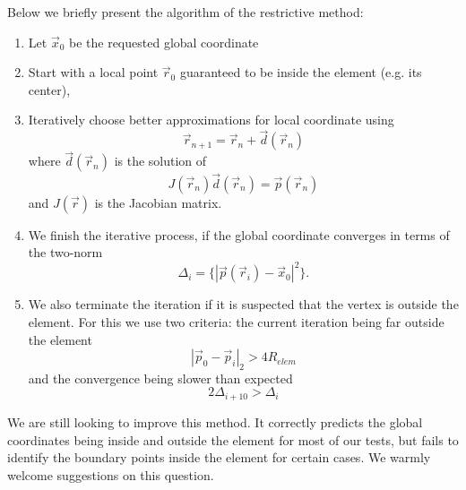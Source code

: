 \noindent
Below we briefly present the algorithm of the restrictive method:
\begin{enumerate}
	\item Let $\vec{x}_0$ be the requested global coordinate
	\item Start with a local point $\vec{r}_0$ guaranteed to be inside the element (e.g. its center),
	\item Iteratively choose better approximations for local coordinate using \[\vec{r}_{n+1} = \vec{r}_n + \vec{d}(\vec{r}_n)\] where $\vec{d}(\vec{r}_n)$ is the solution of
	        \[ J(\vec{r}_n) \vec{d}(\vec{r}_n) = \vec{p}(\vec{r}_n) \] and $J(\vec{r})$ is the Jacobian matrix.
	\item We finish the iterative process, if the global coordinate converges in terms of the two-norm
	        \[\Delta_i = \{ |\vec{p}(\vec{r}_i) - \vec{x}_0 |^2 \}. \]
	\item We also terminate the iteration if it is suspected that the vertex is outside the element. For this we use two criteria: the current iteration being far outside the element \[|\vec{p}_0 - \vec{p}_i|_2 > 4 R_{elem}\] and the convergence being slower than expected \[ 2 \Delta_{i + 10} > \Delta_{i} \]
\end{enumerate}

\noindent
We are still looking to improve this method. It correctly predicts the global coordinates being inside and outside the element for most of our tests, but fails to identify the boundary points inside the element for certain cases. We warmly welcome suggestions on this question.